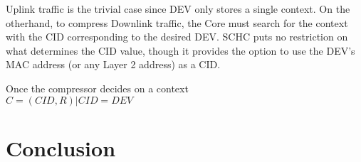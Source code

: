 \documentclass[cspaper]{IEEEtran}
\numberwithin{equation}{subsection}
\begin{document}
	\vspace{1em}
	Uplink traffic is the trivial case since DEV only stores a single context. On the otherhand, to compress Downlink traffic, the Core must search
	for the context with the CID corresponding to the desired DEV. SCHC puts no restriction on what determines the CID value, though it provides 
	the option to use the DEV's MAC address (or any Layer 2 address) as a CID. 

	\vspace{1em}
	Once the compressor decides on a context\\ $C = (CID, R) | CID = DEV$

\section{Conclusion}
\end{document}
